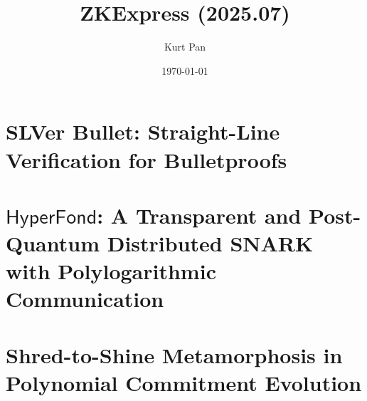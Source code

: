 \documentclass[11pt]{article}
\theoremstyle{definition}
\theoremstyle{remark}
\theoremstyle{plain}
\begin{document}
\title{ZKExpress (2025.07)}
\author{Kurt Pan}
\date{\today}
\maketitle
\tableofcontents

\section{\cite{SLVerBullet} SLVer Bullet: Straight-Line Verification for Bulletproofs}


\section{\cite{HyperFond} $\mathsf{{HyperFond}}$: A Transparent and Post-Quantum Distributed {SNARK} with Polylogarithmic Communication}

\section{\cite{Shred-to-Shine} Shred-to-Shine Metamorphosis in Polynomial Commitment Evolution}





\end{document}
